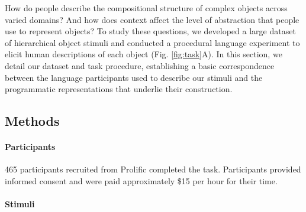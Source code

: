 \documentclass[10pt,letterpaper]{article}
\begin{document}
How do people describe the compositional structure of complex objects across varied domains? And how does context affect the level of abstraction that people use to represent objects? To study these questions, we developed a large dataset of hierarchical object stimuli and conducted a procedural language experiment to elicit human descriptions of each object (Fig. \ref{fig:task}A). In this section, we detail our dataset and task procedure, establishing a basic correspondence between the language participants used to describe our stimuli and the programmatic representations that underlie their construction.

\subsection{Methods}

\paragraph{Participants}
465 participants recruited from Prolific completed the task. 
Participants provided informed consent and were paid approximately \$15 per hour for their time.

\paragraph{Stimuli} 


\end{document}
